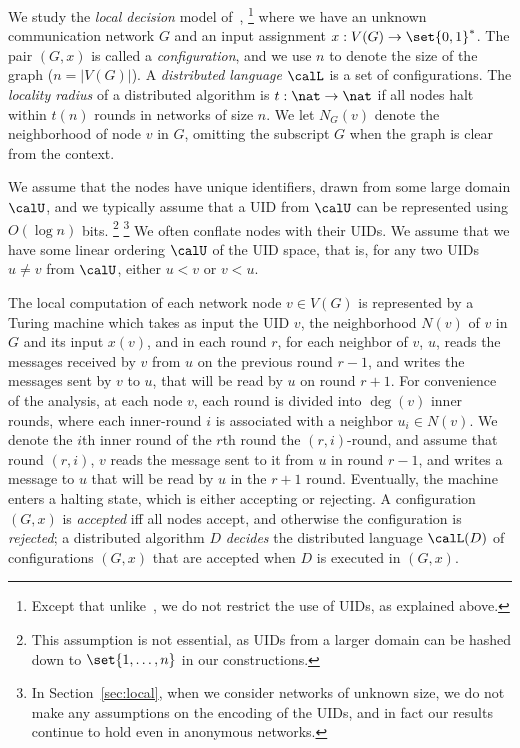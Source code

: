 We study the \emph{local decision} model of~\cite{fraigniaud2013towards},%
\footnote{Except that unlike~\cite{fraigniaud2013towards,balliu2018can},
we do not restrict the use of UIDs, as explained above.}
where we have an unknown communication network $G$ and an input assignment $x : V(G) \rightarrow \set{0,1}^*$.
The pair $(G, x)$ is called a \emph{configuration},
and we use $n$ to denote the size of the graph ($n = |V(G)|$).
A \emph{distributed language} $\calL$ is a set of configurations.
The \emph{locality radius} of a distributed algorithm is $t : \nat \rightarrow \nat$
if all nodes halt within $t(n)$ rounds in networks of size $n$.
We let $N_G(v)$ denote the neighborhood of node $v$ in $G$, omitting the subscript $G$
when the graph is clear from the context.


We assume that the nodes have unique identifiers, drawn from some large domain $\calU$,
and we typically assume that a UID from $\calU$ can be represented using $O(\log n)$ bits.%
\footnote{This assumption is not essential, as UIDs from a larger domain can be hashed down to $\set{1,\ldots,n}$
in our constructions.}%
\footnote{In Section~\ref{sec:local}, when we consider networks of unknown size, we do not make
any assumptions on the encoding of the UIDs, and in fact our results continue to hold even
in anonymous networks.}
We often conflate nodes with their UIDs.
We assume that we have some linear ordering $\calU$ of the UID space, that is, for any two UIDs $u \neq v$ from $\calU$,
either $u < v$ or $v < u$.


The local computation of each network node $v \in V(G)$ is represented by a Turing machine which takes as input the UID $v$, the neighborhood $N(v)$ of $v$ in $G$ and its input $x(v)$, and in each round $r$, for each neighbor of $v$, $u$, reads the messages received by $v$ from $u$ on the previous round $r-1$, and writes the messages sent by $v$ to $u$, that will be read by $u$ on round $r+1$.
For convenience of the analysis, at each node $v$, each round is divided into $\deg(v)$ inner rounds, where each inner-round $i$ is associated with a neighbor $u_i\in N(v)$. We denote the $i$th inner round of the $r$th round the $(r,i)$-round, and assume that round $(r,i)$, $v$ reads the message sent to it from $u$ in round $r-1$, and writes a message to $u$ that will be read by $u$ in the $r+1$ round. Eventually, the machine enters a halting state, which is either accepting or rejecting. A configuration $(G, x)$ is \emph{accepted} iff all nodes accept, and otherwise the configuration is \emph{rejected}; a distributed algorithm $D$ \emph{decides} the distributed language $\calL(D)$ of configurations $(G,x)$ that are accepted when $D$ is executed in $(G,x)$.
